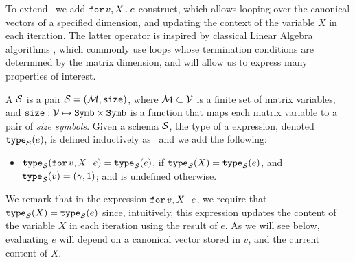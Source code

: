 To extend \lang\, we add $\texttt{for}\, v,X \texttt{.}\, e$ construct, which allows looping over the canonical vectors of a specified dimension, and updating the context of the variable $X$ in each iteration. The latter operator is inspired by classical Linear Algebra algorithms \cite{num}, which commonly use loops whose termination conditions are determined by the matrix dimension, and will allow us to express many properties of interest.

A  $\mathcal{S}$ is a pair $\mathcal{S}=(\mathcal{M},\texttt{size})$, where $\mathcal{M}\subset \mathcal{V}$ is a finite set of matrix variables, and $\texttt{size}: \mathcal{V} \mapsto \texttt{Symb}\times \texttt{Symb}$ is a function that maps each matrix variable to a pair of {\em size symbols}. Given a schema $\mathcal{S}$, the type of a \langfor expression, denoted $\texttt{type}_{\mathcal{S}}(e)$, is defined inductively as \lang\, and we add the following:
\begin{itemize}
\item $\texttt{type}_{\mathcal{S}}(\texttt{for}\, v,X \texttt{.}\, e) = \texttt{type}_{\mathcal{S}}(e)$, if $\texttt{type}_{\mathcal{S}}(X) = \texttt{type}_{\mathcal{S}}(e)$, and $\texttt{type}_{\mathcal{S}}(v) = (\gamma,1)$; and is undefined otherwise.
\end{itemize}

We remark that in the expression $\texttt{for}\, v,X \texttt{.}\, e$, we require that $\texttt{type}_{\mathcal{S}}(X) = \texttt{type}_{\mathcal{S}}(e)$ since, intuitively, this expression updates the content of the variable $X$ in each iteration using the result of $e$. As we will see below, evaluating $e$ will depend on a canonical vector stored in $v$, and the current content of $X$. %

